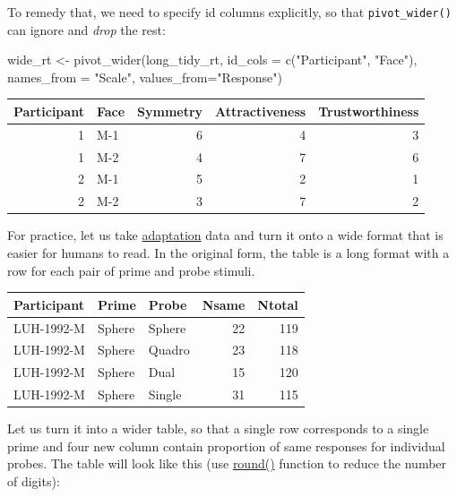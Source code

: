 \documentclass[
]{book}
\newenvironment{Shaded}{\begin{snugshade}}{\end{snugshade}}
\newcommand{\AttributeTok}[1]{\textcolor[rgb]{0.77,0.63,0.00}{#1}}
\newcommand{\FunctionTok}[1]{\textcolor[rgb]{0.00,0.00,0.00}{#1}}
\newcommand{\NormalTok}[1]{#1}
\newcommand{\OtherTok}[1]{\textcolor[rgb]{0.56,0.35,0.01}{#1}}
\newcommand{\StringTok}[1]{\textcolor[rgb]{0.31,0.60,0.02}{#1}}
\begin{document}
To remedy that, we need to specify id columns explicitly, so that \texttt{pivot\_wider()} can ignore and \emph{drop} the rest:

\begin{Shaded}
\begin{Highlighting}[]
\NormalTok{wide\_rt }\OtherTok{\textless{}{-}}
  \FunctionTok{pivot\_wider}\NormalTok{(long\_tidy\_rt,}
              \AttributeTok{id\_cols =} \FunctionTok{c}\NormalTok{(}\StringTok{"Participant"}\NormalTok{, }\StringTok{"Face"}\NormalTok{),}
              \AttributeTok{names\_from =} \StringTok{"Scale"}\NormalTok{,}
              \AttributeTok{values\_from=}\StringTok{"Response"}\NormalTok{) }
\end{Highlighting}
\end{Shaded}

\begin{tabular}{r|l|r|r|r}
\hline
Participant & Face & Symmetry & Attractiveness & Trustworthiness\\
\hline
1 & M-1 & 6 & 4 & 3\\
\hline
1 & M-2 & 4 & 7 & 6\\
\hline
2 & M-1 & 5 & 2 & 1\\
\hline
2 & M-2 & 3 & 7 & 2\\
\hline
\end{tabular}

For practice, let us take \href{data/bands-adaptation.csv}{adaptation} data and turn it onto a wide format that is easier for humans to read. In the original form, the table is a long format with a row for each pair of prime and probe stimuli.

\begin{tabular}{l|l|l|r|r}
\hline
Participant & Prime & Probe & Nsame & Ntotal\\
\hline
LUH-1992-M & Sphere & Sphere & 22 & 119\\
\hline
LUH-1992-M & Sphere & Quadro & 23 & 118\\
\hline
LUH-1992-M & Sphere & Dual & 15 & 120\\
\hline
LUH-1992-M & Sphere & Single & 31 & 115\\
\hline
\end{tabular}

Let us turn it into a wider table, so that a single row corresponds to a single prime and four new column contain proportion of same responses for individual probes. The table will look like this (use \href{https://stat.ethz.ch/R-manual/R-devel/library/base/html/Round.html}{round()} function to reduce the number of digits):
\end{document}
